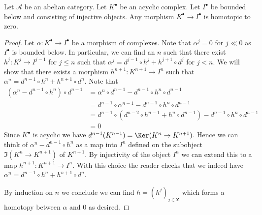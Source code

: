 \begin{lemma}
\label{lemma-acyclic-is-zero}
Let $\mathcal{A}$ be an abelian category.
Let $K^\bullet$ be an acyclic complex.
Let $I^\bullet$ be bounded below and consisting of injective objects.
Any morphism $K^\bullet \to I^\bullet$ is homotopic to zero.
\end{lemma}

\begin{proof}
Let $\alpha : K^\bullet \to I^\bullet$ be a morphism of
complexes. Note that $\alpha^j = 0$ for $j \ll 0$ as $I^\bullet$
is bounded below. In particular, we can find an $n$ such that
there exist $h^j :  K^j \to I^{j - 1}$ for $j \leq n$ such that
$\alpha^j = d^{j - 1} \circ h^j + h^{j + 1} \circ d^j$
for $j < n$. We will show that there exists a morphism
$h^{n + 1} : K^{n + 1} \to I^n$
such that $\alpha^n = d^{n - 1} \circ h^n + h^{n + 1} \circ d^n$.
Note that
\begin{align*}
(\alpha^n - d^{n - 1} \circ h^n) \circ d^{n - 1}
& =
\alpha^n \circ d^{n - 1} - d^{n - 1} \circ h^n \circ d^{n - 1} \\
& =
d^{n - 1} \circ \alpha^{n - 1} - d^{n - 1} \circ h^n \circ d^{n - 1} \\
& =
d^{n - 1} \circ (d^{n - 2} \circ h^{n - 1} + h^n \circ d^{n - 1})
- d^{n - 1} \circ h^n \circ d^{n - 1} \\
& = 0
\end{align*}
Since $K^\bullet$ is acyclic we have
$d^{n - 1}(K^{n - 1}) = \Ker(K^n \to K^{n + 1})$.
Hence we can think of $\alpha^n -  d^{n - 1} \circ h^n$
as a map into $I^n$ defined on the subobject $\Im(K^n \to K^{n + 1})$
of $K^{n + 1}$. By injectivity of the object $I^n$ we can extend this to
a map $h^{n + 1} : K^{n + 1} \to I^n$. With this choice the reader
checks that we indeed have
$\alpha^n = d^{n - 1} \circ h^n + h^{n + 1} \circ d^n$.

\medskip\noindent
By induction on $n$ we conclude we can find $h  = (h^j)_{j \in \mathbf{Z}}$
which forms a homotopy between $\alpha$ and $0$ as desired.
\end{proof}

